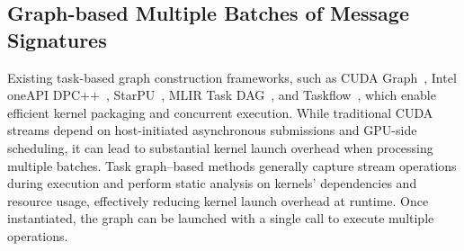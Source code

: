 \documentclass[10pt,conference]{IEEEtran}
\begin{document}
\begin{table}[htbp]
\centering
  \captionsetup{font=small} 
\caption{Bank conflicts comparison between baseline and our padding strategy during Reduction process profiled by Nsight System.}
\label{tab:bank_conflict_padding}
\renewcommand{\arraystretch}{1.15}
\setlength{\tabcolsep}{4pt}
\end{table}



\subsection{Graph-based Multiple Batches of Message Signatures}
 Existing task-based graph construction frameworks, such as CUDA Graph~\cite{nvidia_cudagraph}, Intel oneAPI DPC++~\cite{intel_dpcpp}, StarPU~\cite{augonnet2011starpu}, MLIR Task DAG~\cite{mlir_taskdag}, and Taskflow~\cite{taskflow2023}, which enable efficient kernel packaging and concurrent execution. While traditional CUDA streams depend on host-initiated asynchronous submissions and GPU-side scheduling, it can lead to substantial kernel launch overhead when processing multiple batches. Task graph–based methods generally capture stream operations during execution and perform static analysis on kernels' dependencies and resource usage, effectively reducing kernel launch overhead at runtime. Once instantiated, the graph can be launched with a single call to execute multiple operations. 
\end{document}
